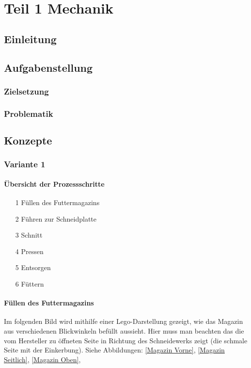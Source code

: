 \chapter{Teil 1 Mechanik}
\section{Einleitung}
\section{Aufgabenstellung}
\subsection{Zielsetzung}
\subsection{Problematik}
\newpage
\section{Konzepte} 



\subsection{Variante 1} 
\subsubsection{Übersicht der Prozessschritte}
\begin{itemize}
\item[1] Füllen des Futtermagazins
\item[2] Führen zur Schneidplatte
\item[3] Schnitt
\item[4] Pressen
\item[5] Entsorgen
\item[6] Füttern
\end{itemize}

\subsubsection{Füllen des Futtermagazins}

Im folgenden Bild wird mithilfe einer Lego-Darstellung gezeigt, wie das Magazin aus verschiedenen Blickwinkeln befüllt aussieht. Hier muss man beachten das die vom Hersteller zu öffneten Seite in Richtung des Schneidewerks zeigt (die schmale Seite mit der Einkerbung). Siehe Abbildungen: \ref{Magazin Vorne}, \ref{Magazin Seitlich}, \ref{Magazin Oben}, 

